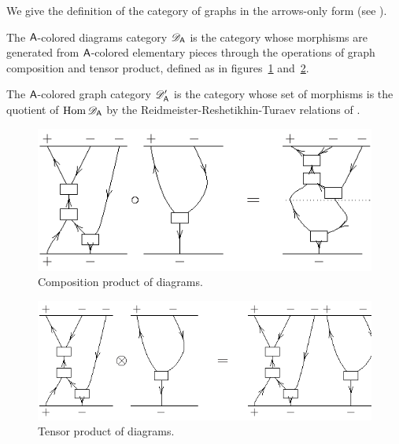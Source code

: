 We give the definition of the category of graphs in the arrows-only
form (see ). 
\begin{definition}
  The $\A$-colored diagrams category $\RTD[\A]$ is the category whose
  morphisms are generated from $\A$-colored elementary pieces through
  the operations of graph composition and tensor product, defined as
  in figures~\ref{fig:gc-graph-composition}
  and~\ref{fig:gc-graph-otimes}.
  
  The $\A$-colored graph category $\RTE[\A]$ is the category whose set
  of morphisms is the quotient of $\Hom\RTD[\A]$ by the
  Reidmeister-Reshetikhin-Turaev relations of .
\end{definition}
\begin{figure}[p]
  \centering\includegraphics{fig-001}
  \caption{Composition product of diagrams.}
  \label{fig:gc-graph-composition}
\end{figure}
\begin{figure}[p]
  \centering\includegraphics{fig-002}
  \caption{Tensor product of diagrams.}
  \label{fig:gc-graph-otimes}
\end{figure}
